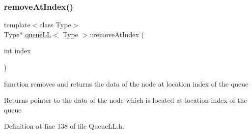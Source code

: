 \subsubsection{\texorpdfstring{remove\+At\+Index()}{removeAtIndex()}}
{\footnotesize\ttfamily template$<$class Type$>$ \\
Type$\ast$ \hyperlink{classqueue_l_l}{queue\+LL}$<$ Type $>$\+::remove\+At\+Index (\begin{DoxyParamCaption}\item[{int}]{index }\end{DoxyParamCaption})\hspace{0.3cm}{\ttfamily [inline]}}

function removes and returns the data of the node at location index of the queue \begin{DoxyReturn}{Returns}
pointer to the data of the node which is located at location index of the queue 
\end{DoxyReturn}


Definition at line 138 of file Queue\+L\+L.\+h.


